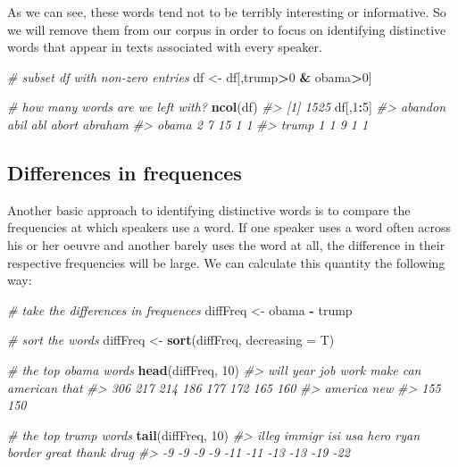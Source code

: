\documentclass[]{book}
\newenvironment{Shaded}{\begin{snugshade}}{\end{snugshade}}
\newcommand{\CommentTok}[1]{\textcolor[rgb]{0.56,0.35,0.01}{\textit{#1}}}
\newcommand{\DataTypeTok}[1]{\textcolor[rgb]{0.13,0.29,0.53}{#1}}
\newcommand{\DecValTok}[1]{\textcolor[rgb]{0.00,0.00,0.81}{#1}}
\newcommand{\KeywordTok}[1]{\textcolor[rgb]{0.13,0.29,0.53}{\textbf{#1}}}
\newcommand{\NormalTok}[1]{#1}
\newcommand{\OperatorTok}[1]{\textcolor[rgb]{0.81,0.36,0.00}{\textbf{#1}}}
\newcommand{\StringTok}[1]{\textcolor[rgb]{0.31,0.60,0.02}{#1}}
\begin{document}
As we can see, these words tend not to be terribly interesting or informative. So we will remove them from our corpus in order to focus on identifying distinctive words that appear in texts associated with every speaker.

\begin{Shaded}
\begin{Highlighting}[]
\CommentTok{# subset df with non-zero entries}
\NormalTok{df <-}\StringTok{ }\NormalTok{df[,trump}\OperatorTok{>}\DecValTok{0} \OperatorTok{&}\StringTok{ }\NormalTok{obama}\OperatorTok{>}\DecValTok{0}\NormalTok{]}

\CommentTok{# how many words are we left with?}
\KeywordTok{ncol}\NormalTok{(df)}
\CommentTok{#> [1] 1525}
\NormalTok{df[,}\DecValTok{1}\OperatorTok{:}\DecValTok{5}\NormalTok{]}
\CommentTok{#>       abandon abil abl abort abraham}
\CommentTok{#> obama       2    7  15     1       1}
\CommentTok{#> trump       1    1   9     1       1}
\end{Highlighting}
\end{Shaded}

\hypertarget{differences-in-frequences}{%
\subsection{Differences in frequences}\label{differences-in-frequences}}

Another basic approach to identifying distinctive words is to compare the frequencies at which speakers use a word. If one speaker uses a word often across his or her oeuvre and another barely uses the word at all, the difference in their respective frequencies will be large. We can calculate this quantity the following way:

\begin{Shaded}
\begin{Highlighting}[]
\CommentTok{# take the differences in frequences}
\NormalTok{diffFreq <-}\StringTok{ }\NormalTok{obama }\OperatorTok{-}\StringTok{ }\NormalTok{trump}

\CommentTok{# sort the words}
\NormalTok{diffFreq <-}\StringTok{ }\KeywordTok{sort}\NormalTok{(diffFreq, }\DataTypeTok{decreasing =}\NormalTok{ T)}

\CommentTok{# the top obama words}
\KeywordTok{head}\NormalTok{(diffFreq, }\DecValTok{10}\NormalTok{)}
\CommentTok{#>     will     year      job     work     make      can american     that }
\CommentTok{#>      306      217      214      186      177      172      165      160 }
\CommentTok{#>  america      new }
\CommentTok{#>      155      150}

\CommentTok{# the top trump words}
\KeywordTok{tail}\NormalTok{(diffFreq, }\DecValTok{10}\NormalTok{)}
\CommentTok{#>  illeg immigr    isi    usa   hero   ryan border  great  thank   drug }
\CommentTok{#>     -9     -9     -9     -9    -11    -11    -13    -13    -19    -22}
\end{Highlighting}
\end{Shaded}
\end{document}
